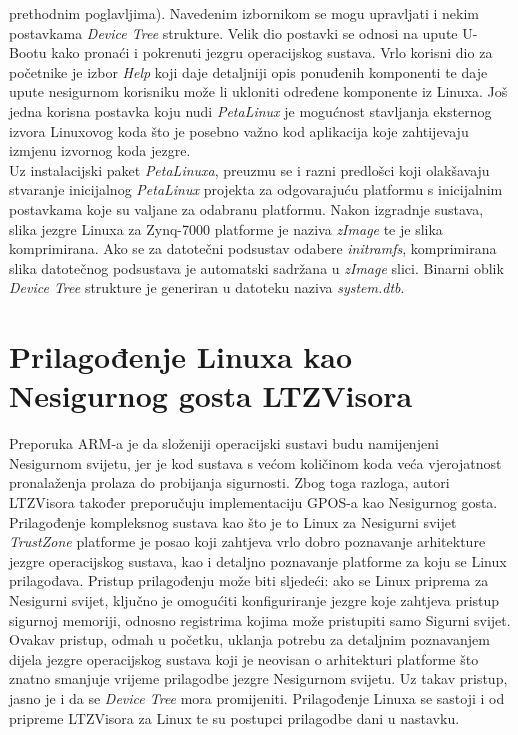 \documentclass[times, utf8, diplomski, numeric]{fer}
\begin{document}
prethodnim poglavljima). Navedenim izbornikom se mogu upravljati i nekim postavkama \textit{Device Tree} strukture. Velik dio
postavki se odnosi na upute U-Bootu kako pronaći i pokrenuti jezgru operacijskog sustava. Vrlo korisni dio za početnike je
izbor \textit{Help} koji daje detaljniji opis ponuđenih komponenti te daje upute nesigurnom korisniku može li ukloniti
određene komponente iz Linuxa. Još jedna korisna postavka koju nudi \textit{PetaLinux} je mogućnost stavljanja eksternog
izvora Linuxovog koda što je posebno važno kod aplikacija koje zahtijevaju izmjenu izvornog koda jezgre.\\
Uz instalacijski paket \textit{PetaLinuxa}, preuzmu se i razni predlošci koji olakšavaju stvaranje inicijalnog
\textit{PetaLinux} projekta za odgovarajuću platformu s inicijalnim postavkama koje su valjane za odabranu platformu. Nakon
izgradnje sustava, slika jezgre Linuxa za Zynq-7000 platforme je naziva \textit{zImage} te je slika komprimirana. Ako se
za datotečni podsustav odabere \textit{initramfs}, komprimirana slika datotečnog podsustava je automatski sadržana u
\textit{zImage} slici. Binarni oblik \textit{Device Tree} strukture je generiran u datoteku naziva \textit{system.dtb}.

\section{Prilagođenje Linuxa kao Nesigurnog gosta LTZVisora}
Preporuka ARM-a je da složeniji operacijski sustavi budu namijenjeni Nesigurnom svijetu, jer je kod sustava s većom
količinom koda veća vjerojatnost pronalaženja prolaza do probijanja sigurnosti. Zbog toga razloga, autori LTZVisora također
preporučuju implementaciju GPOS-a kao Nesigurnog gosta. Prilagođenje kompleksnog sustava kao što je to Linux za Nesigurni
svijet \textit{TrustZone} platforme je posao koji zahtjeva vrlo dobro poznavanje arhitekture jezgre operacijskog sustava, kao
i detaljno poznavanje platforme za koju se Linux prilagođava. Pristup prilagođenju može biti sljedeći: ako se Linux priprema
za Nesigurni svijet, ključno je omogućiti konfiguriranje jezgre koje zahtjeva pristup sigurnoj memoriji, odnosno registrima
kojima može pristupiti samo Sigurni svijet. Ovakav pristup, odmah u početku, uklanja potrebu za detaljnim poznavanjem
dijela jezgre operacijskog sustava koji je neovisan o arhitekturi platforme što znatno smanjuje vrijeme prilagodbe jezgre
Nesigurnom svijetu. Uz takav pristup, jasno je i da se \textit{Device Tree} mora promijeniti. Prilagođenje Linuxa se sastoji
i od pripreme LTZVisora za Linux te su postupci prilagodbe dani u nastavku.
\end{document}

